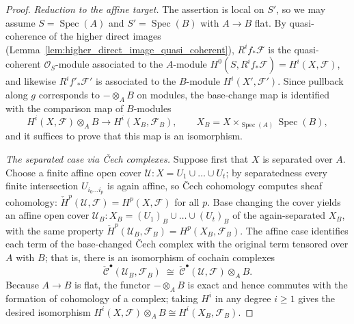 \begin{proof}
  \emph{Reduction to the affine target.} The assertion is local on \(S'\), so we
  may assume \(S = \operatorname{Spec}(A)\) and \(S' = \operatorname{Spec}(B)\) with
  \(A \to B\) flat. By quasi-coherence of the higher direct images
  (Lemma~\ref{lem:higher_direct_image_quasi_coherent}), \(R^i f_*\mathcal{F}\) is
  the quasi-coherent \(\mathcal{O}_S\)-module associated to the \(A\)-module
  \(H^0(S, R^i f_*\mathcal{F}) = H^i(X, \mathcal{F})\), and likewise
  \(R^i f'_*\mathcal{F}'\) is associated to the \(B\)-module
  \(H^i(X', \mathcal{F}')\). Since pullback along \(g\) corresponds to
  \(- \otimes_A B\) on modules, the base-change map is identified with the
  comparison map of \(B\)-modules
  \[
    H^i(X, \mathcal{F}) \otimes_A B \longrightarrow H^i(X_B, \mathcal{F}_B),
    \qquad X_B = X \times_{\operatorname{Spec}(A)} \operatorname{Spec}(B),
  \]
  and it suffices to prove that this map is an isomorphism.

  \medskip
  \emph{The separated case via {\v C}ech complexes.} Suppose first that \(X\) is
  separated over \(A\). Choose a finite affine open cover
  \(\mathcal{U} : X = U_1 \cup \dots \cup U_t\); by separatedness every finite
  intersection \(U_{i_0 \dots i_p}\) is again affine, so {\v C}ech cohomology
  computes sheaf cohomology:
  \(\check{H}^p(\mathcal{U}, \mathcal{F}) = H^p(X, \mathcal{F})\) for all \(p\).
  Base changing the cover yields an affine open cover
  \(\mathcal{U}_B : X_B = (U_1)_B \cup \dots \cup (U_t)_B\) of the again-separated
  \(X_B\), with the same property
  \(\check{H}^p(\mathcal{U}_B, \mathcal{F}_B) = H^p(X_B, \mathcal{F}_B)\). The
  affine case identifies each term of the base-changed {\v C}ech complex with the
  original term tensored over \(A\) with \(B\); that is, there is an isomorphism of
  cochain complexes
  \[
    \check{\mathcal{C}}^\bullet(\mathcal{U}_B, \mathcal{F}_B) \;\cong\;
    \check{\mathcal{C}}^\bullet(\mathcal{U}, \mathcal{F}) \otimes_A B .
  \]
  Because \(A \to B\) is flat, the functor \(- \otimes_A B\) is exact and hence
  commutes with the formation of cohomology of a complex; taking \(H^i\) in any
  degree \(i \geq 1\) gives the desired isomorphism
  \(H^i(X, \mathcal{F}) \otimes_A B \cong H^i(X_B, \mathcal{F}_B)\).


\end{proof}
